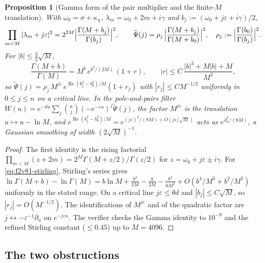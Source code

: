 \documentclass[11pt]{article}
\newtheorem{proposition}[theorem]{Proposition}
\theoremstyle{definition}
\theoremstyle{remark}
\begin{document}
\begin{proposition}[Gamma form of the pair multiplier and the finite-\(M\) translation]
\label{prop:f2v81-gamma}
With \(\omega_0=\sigma+\kappa_\chi\), \(\lambda_m=\omega_0+2m+i\gamma\) and
\(b_j:=(\omega_0+j\varepsilon+i\gamma)/2\),
\begin{equation}
 \prod_{m<M}|\lambda_m+j\varepsilon|^2=2^{2M}\Bigl|\frac{\Gamma(M+b_j)}{\Gamma(b_j)}\Bigr|^2,
 \qquad
 \widetilde\Psi(j)=\rho_j\,\Bigl|\frac{\Gamma(M+b_j)}{\Gamma(M+b_0)}\Bigr|^2,\quad
 \rho_j:=\Bigl|\frac{\Gamma(b_0)}{\Gamma(b_j)}\Bigr|^2 .
 \label{eq:f2v81-gamma}
\end{equation}
For \(|b|\le\tfrac35\sqrt M\),
\begin{equation}
 \frac{\Gamma(M+b)}{\Gamma(M)}=M^{b}\,e^{b^2/(2M)}\,(1+r),\qquad
 |r|\le C\,\frac{|b|^3+M|b|+M}{M^2},
 \label{eq:f2v81-stirling}
\end{equation}
so \(\widetilde\Psi(j)=\rho_j\,M^{j\varepsilon}\,e^{\operatorname{Re}(b_j^2-b_0^2)/M}(1+r_j)\)
with \(|r_j|\le CM^{-1/2}\) uniformly in \(0\le j\le n\) on a critical
line.  In the pole-and-pairs filter
\(W(u)=e^{-du}\sum_j\binom nj(-e^{-\varepsilon u})^j\widetilde\Psi(j)\), the
factor \(M^{j\varepsilon}\) is the translation \(u\mapsto u-\ln M\), and
\(e^{\operatorname{Re}(b_j^2-b_0^2)/M}=e^{(j\varepsilon)^2/(8M)+O(j\varepsilon/\sqrt M)}\)
acts as \(e^{\partial_u^2/(8M)}\), a Gaussian smoothing of width
\((2\sqrt M)^{-1}\).
\end{proposition}

\begin{proof}
The first identity is the rising factorial \(\prod_{m<M}(z+2m)=2^M\Gamma(M+z/2)/\Gamma(z/2)\)
for \(z=\omega_0+j\varepsilon\pm i\gamma\).  For \eqref{eq:f2v81-stirling},
Stirling's series gives
\(\ln\Gamma(M+b)-\ln\Gamma(M)=b\ln M+\tfrac{b^2}{2M}-\tfrac{b}{2M}-\tfrac{b^3}{6M^2}+O(b^4/M^3+b^2/M^2)\)
uniformly in the stated range.  On a critical line \(j\varepsilon\le\theta d\)
and \(|b_j|\le C\sqrt M\), so \(|r_j|=O(M^{-1/2})\).  The identifications
of \(M^{j\varepsilon}\) and of the quadratic factor are
\(j\leftrightarrow-\varepsilon^{-1}\partial_u\) on \(e^{-j\varepsilon u}\).
The verifier checks the Gamma identity to \(10^{-9}\) and the refined
Stirling constant (\(\le0.45\)) up to \(M=4096\).
\end{proof}

\subsection{The two obstructions}
\end{document}
